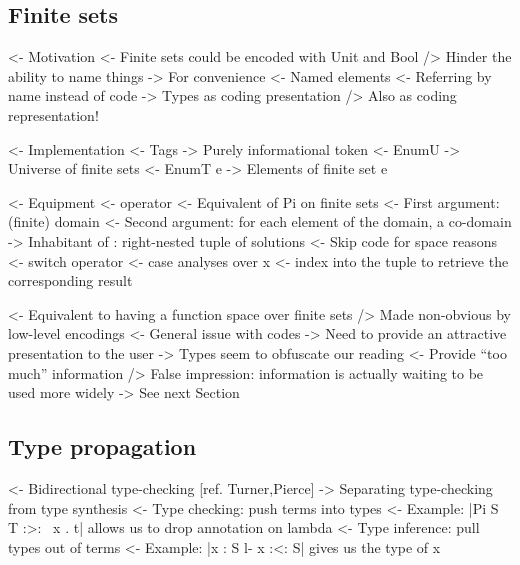 \documentclass{article}
\newenvironment{structure}{\footnotesize\verbatim}{\endverbatim}
\begin{document}
\subsection{Finite sets}

\begin{structure}
<- Motivation
    <- Finite sets could be encoded with Unit and Bool
        /> Hinder the ability to name things
    -> For convenience
        <- Named elements
        <- Referring by name instead of code
        -> Types as coding presentation
            /> Also as coding representation!
\end{structure}

\begin{structure}
<- Implementation
    <- Tags
        -> Purely informational token
    <- EnumU
        -> Universe of finite sets
    <- EnumT e
        -> Elements of finite set e
\end{structure}

\begin{structure}
<- Equipment
    <- \spi operator
        <- Equivalent of Pi on finite sets
        <- First argument: (finite) domain
        <- Second argument: for each element of the domain, a co-domain
        -> Inhabitant of \spi: right-nested tuple of solutions
            <- Skip code for space reasons
    <- switch operator
        <- case analyses over x
        <- index into the \spi tuple to retrieve the corresponding result
\end{structure}

\begin{structure}
<- Equivalent to having a function space over finite sets
    /> Made non-obvious by low-level encodings
        <- General issue with codes
             -> Need to provide an attractive presentation to the user
    -> Types seem to obfuscate our reading
        <- Provide ``too much'' information
        /> False impression: information is actually waiting to be used more widely
        -> See next Section
\end{structure}

\subsection{Type propagation}

\begin{structure}
<- Bidirectional type-checking [ref. Turner,Pierce]
    -> Separating type-checking from type synthesis
    <- Type checking: push terms into types
        <- Example: |Pi S T :>: \ x . t| allows us to drop annotation on lambda
    <- Type inference: pull types out of terms
        <- Example: |x : S l- x :<: S| gives us the type of x
\end{structure}
\end{document}
